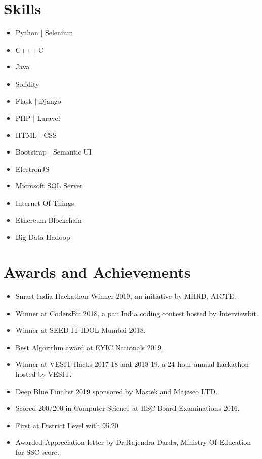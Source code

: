 \documentclass[11pt,a4paper]{moderncv}
\begin{document}
\section{Skills}
\begin{itemize}
	
	\item Python | Selenium
	\item C++ | C
	\item Java
	\item Solidity
	\item Flask | Django
	\item PHP | Laravel
	\item HTML | CSS
	\item Bootstrap | Semantic UI
	\item ElectronJS
\item Microsoft SQL Server
\item Internet Of Things
\item Ethereum Blockchain
\item Big Data Hadoop
	
\end{itemize}
	
\section{Awards and Achievements}

\begin{itemize}
	
	\item Smart India Hackathon Winner 2019, an initiative by MHRD, AICTE.
	\item Winner at CodersBit 2018, a pan India coding contest hosted by Interviewbit.
	\item Winner at SEED IT IDOL Mumbai 2018.
	\item Best Algorithm award at EYIC Nationals 2019.
	\item Winner at VESIT Hacks 2017-18 and 2018-19, a 24 hour annual hackathon hosted by VESIT.
	\item Deep Blue Finalist 2019 sponsored by Mastek and Majesco LTD.
	\item Scored 200/200 in Computer Science at HSC Board Examinations 2016.
	\item First at District Level with 95.20%
	\item Awarded Appreciation letter by Dr.Rajendra Darda, Ministry Of Education for SSC score.

\end{itemize}
\end{document}
